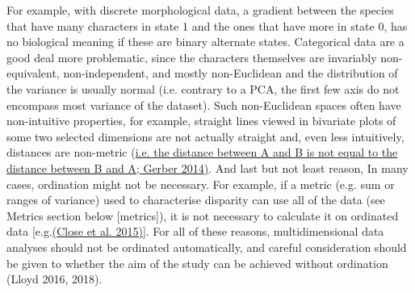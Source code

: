 \documentclass[12pt,letterpaper]{article}
\renewcommand{\subsection}[1]{%
\bigskip
\begin{center}
\begin{large}
\normalfont\itshape #1
\end{large}
\end{center}}
\begin{document}
For example, with discrete morphological data, a gradient between the species that have many characters in state 1 and the ones that have more in state 0, has no biological meaning if these are binary alternate states.
Categorical data are a good deal more problematic, since the characters themselves are invariably non-equivalent, non-independent, and mostly non-Euclidean and the distribution of the variance is usually normal (i.e. contrary to a PCA, the first few axis do not encompass most variance of the dataset).
Such non-Euclidean spaces often have non-intuitive properties, for example, straight lines viewed in bivariate plots of some two selected dimensions are not actually straight and, even less intuitively, distances are non-metric (\href{https://paperpile.com/c/sTGYvp/SJbC}{i.e. the distance between A and B is not equal to the distance between B and A; Gerber 2014)}.
And last but not least reason, In many cases, ordination might not be necessary.
For example, if a metric (e.g. sum or ranges of variance) used to characterise disparity can use all of the data (see Metrics section below {[}metrics{]}), it is not necessary to calculate it on ordinated data {[}e.g.\href{https://paperpile.com/c/sTGYvp/PbSx}{(Close et al. 2015)}{]}.
For all of these reasons, multidimensional data analyses should not be ordinated automatically, and careful consideration should be given to whether the aim of the study can be achieved without ordination (Lloyd 2016, 2018).


\end{document}
